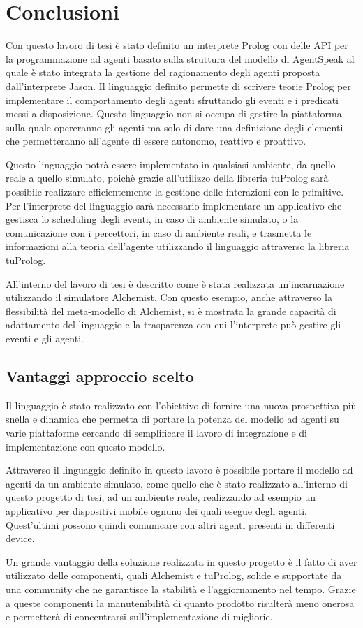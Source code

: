 \chapter{Conclusioni}\label{chap:conclusions}
Con questo lavoro di tesi è stato definito un interprete Prolog con delle API per la programmazione ad agenti basato sulla struttura del modello di AgentSpeak al quale è stato integrata la gestione del ragionamento degli agenti proposta dall'interprete Jason.
%
Il linguaggio definito permette di scrivere teorie Prolog per implementare il comportamento degli agenti sfruttando gli eventi e i predicati messi a disposizione.
Questo linguaggio non si occupa di gestire la piattaforma sulla quale opereranno gli agenti ma solo di dare una definizione degli elementi che permetteranno all'agente di essere autonomo, reattivo e proattivo.

Questo linguaggio potrà essere implementato in qualsiasi ambiente, da quello reale a quello simulato, poichè grazie all'utilizzo della libreria tuProlog sarà possibile realizzare efficientemente la gestione delle interazioni con le primitive.
%
Per l'interprete del linguaggio sarà necessario implementare un applicativo che gestisca lo scheduling degli eventi, in caso di ambiente simulato, o la comunicazione con i percettori, in caso di ambiente reali, e trasmetta le informazioni alla teoria dell'agente utilizzando il linguaggio attraverso la libreria tuProlog.

All'interno del lavoro di tesi è descritto come è stata realizzata un'incarnazione utilizzando il simulatore Alchemist.
Con questo esempio, anche attraverso la flessibilità del meta-modello di Alchemist, si è mostrata la grande capacità di adattamento del linguaggio e la trasparenza con cui l'interprete può gestire gli eventi e gli agenti.

\section{Vantaggi approccio scelto}
Il linguaggio è stato realizzato con l'obiettivo di fornire una nuova prospettiva più snella e dinamica che permetta di portare la potenza del modello ad agenti su varie piattaforme cercando di semplificare il lavoro di integrazione e di implementazione con questo modello.

Attraverso il linguaggio definito in questo lavoro è possibile portare il modello ad agenti da un ambiente simulato, come quello che è stato realizzato all'interno di questo progetto di tesi, ad un ambiente reale, realizzando ad esempio un applicativo per dispositivi mobile ognuno dei quali esegue degli agenti. Quest'ultimi possono quindi comunicare con altri agenti presenti in differenti device.

Un grande vantaggio della soluzione realizzata in questo progetto è il fatto di aver utilizzato delle componenti, quali Alchemist e tuProlog, solide e supportate da una community che ne garantisce la stabilità e l'aggiornamento nel tempo.
Grazie a queste componenti la manutenibilità di quanto prodotto risulterà meno onerosa e permetterà di concentrarsi sull'implementazione di migliorie.

